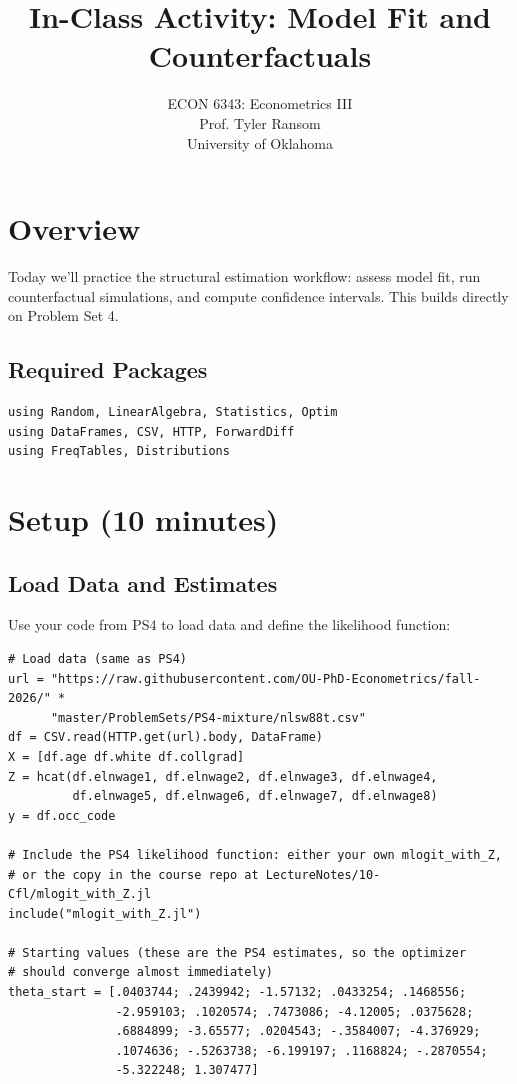\documentclass[12pt,english]{article}
\begin{document}
\title{In-Class Activity: Model Fit and Counterfactuals}
\author{ECON 6343: Econometrics III\\
Prof. Tyler Ransom\\
University of Oklahoma}
\date{}
\maketitle
\section*{Overview}
Today we'll practice the structural estimation workflow: assess model fit, run counterfactual simulations, and compute confidence intervals. This builds directly on Problem Set 4.
\subsection*{Required Packages}
\begin{verbatim}
using Random, LinearAlgebra, Statistics, Optim
using DataFrames, CSV, HTTP, ForwardDiff
using FreqTables, Distributions
\end{verbatim}
\section{Setup (10 minutes)}
\subsection{Load Data and Estimates}
Use your code from PS4 to load data and define the likelihood function:
\begin{verbatim}
# Load data (same as PS4)
url = "https://raw.githubusercontent.com/OU-PhD-Econometrics/fall-2026/" *
      "master/ProblemSets/PS4-mixture/nlsw88t.csv"
df = CSV.read(HTTP.get(url).body, DataFrame)
X = [df.age df.white df.collgrad]
Z = hcat(df.elnwage1, df.elnwage2, df.elnwage3, df.elnwage4,
         df.elnwage5, df.elnwage6, df.elnwage7, df.elnwage8)
y = df.occ_code

# Include the PS4 likelihood function: either your own mlogit_with_Z,
# or the copy in the course repo at LectureNotes/10-Cfl/mlogit_with_Z.jl
include("mlogit_with_Z.jl")

# Starting values (these are the PS4 estimates, so the optimizer
# should converge almost immediately)
theta_start = [.0403744; .2439942; -1.57132; .0433254; .1468556;
               -2.959103; .1020574; .7473086; -4.12005; .0375628;
               .6884899; -3.65577; .0204543; -.3584007; -4.376929;
               .1074636; -.5263738; -6.199197; .1168824; -.2870554;
               -5.322248; 1.307477]
\end{verbatim}
\end{document}
